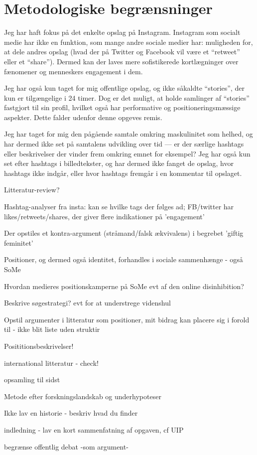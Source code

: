 \section{Metodologiske begrænsninger}
Jeg har haft fokus på det enkelte opslag på Instagram. Instagram 
som socialt medie har ikke en funktion, som mange andre sociale 
medier har: muligheden for, at dele andres opslag (hvad der på 
Twitter og Facebook vil være et “retweet” eller et “share”).  
Dermed kan der laves mere sofistikerede kortlægninger over 
fænomener og menneskers engagement i dem.

Jeg har også kun taget for mig offentlige opslag, og ikke såkaldte 
“stories”, der kun er tilgængelige i 24 timer. Dog er det muligt, 
at holde samlinger af “stories” fastgjort til sin profil, hvilket 
også har performative og positioneringsmæssige aspekter. Dette 
falder udenfor denne opgeves remis.

Jeg har taget for mig den pågående samtale omkring maskulinitet 
som helhed, og har dermed ikke set på samtalens udvikling over tid 
— er der særlige hashtags eller beskrivelser der vinder frem 
omkring emnet for eksempel? Jeg har også kun set efter hashtags i 
billedtekster, og har dermed ikke fanget de opslag, hvor hashtags 
ikke indgår, eller hvor hashtags fremgår i en kommentar til 
opslaget.


Litteratur-review?

Hashtag-analyser fra insta: kan se hvilke tags der følges ad;
FB/twitter har likes/retweets/shares, der giver flere indikationer
på 'engagement'

Der opstiles et kontra-argument (stråmand/falsk ækvivalens) i
begrebet 'giftig feminitet'

Positioner, og dermed også identitet, forhandles i sociale
sammenhænge - også SoMe 

Hvordan medieres positionskamperne på SoMe evt af den online
disinhibition?

Beskrive søgestrategi? evt for at understrege videnshul

Opstil argumenter i litteratur som positioner, mit bidrag kan
placere sig i forold til - ikke blit liste uden struktir

Posititionsbeskrivelser!

international litteratur - check! 

opsamling til sidst

Metode efter forskningslandskab og underhypoteser

Ikke lav en historie - beskriv hvad du finder

indledning - lav en kort sammenfatning af opgaven, cf UIP

begrænse offentlig debat -som argument-
